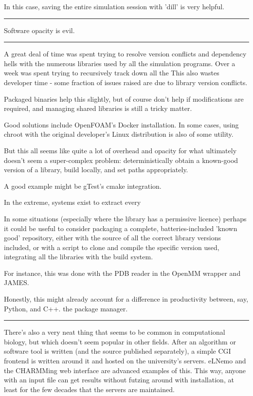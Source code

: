 \documentclass[paper.tex]{subfiles}
\begin{document}
In this case, saving the entire simulation session with 'dill' is very helpful.

\rule{\linewidth}{0.2pt}

Software opacity is evil.

\rule{\linewidth}{0.2pt}

A great deal of time was spent trying to resolve version conflicts and dependency hells with the numerous libraries used by all the simulation programs. Over a week was spent trying to recursively track down all the This also wastes developer time - some fraction of issues raised are due to library version conflicts. 

Packaged binaries help this slightly, but of course don't help if modifications are required, and managing shared libraries is still a tricky matter.

Good solutions include OpenFOAM's Docker installation. In some cases, using chroot with the original developer's Linux distribution is also of some utility.

But this all seems like quite a lot of overhead and opacity for what ultimately doesn't seem a super-complex problem: deterministically obtain a known-good version of a library, build locally, and set paths appropriately.

A good example might be gTest's cmake integration.

In the extreme, systems exist to extract every 

In some situations (especially where the library has a permissive licence) perhaps it could be useful to consider packaging a complete, batteries-included 'known good' repository, either with the source of all the correct library versions included, or with a script to clone and compile the specific version used, integrating all the libraries with the build system. 

For instance, this was done with the PDB reader in the OpenMM wrapper and JAMES.

Honestly, this might already account for a difference in productivity between, say, Python, and C++. the package manager.

\rule{\linewidth}{0.2pt}

There's also a very neat thing that seems to be common in computational biology, but which doesn't seem popular in other fields. After an algorithm or software tool is written (and the source published separately), a simple CGI frontend is written around it and hosted on the university's servers. eLNemo and the CHARMMing web interface are advanced examples of this. This way, anyone with an input file can get results without futzing around with installation, at least for the few decades that the servers are maintained.
\end{document}
